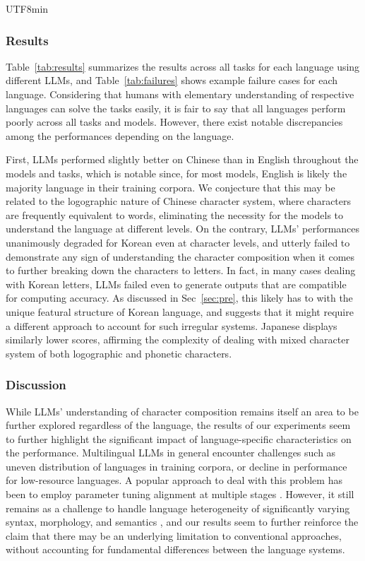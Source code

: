 \documentclass{article}
\theoremstyle{plain}
\theoremstyle{definition}
\theoremstyle{remark}
\begin{document}
\begin{CJK}{UTF8}{min}
\subsubsection{Results}
Table~\ref{tab:results} summarizes the results across all tasks for each language using different LLMs, and Table~\ref{tab:failures} shows example failure cases for each language. Considering that humans with elementary understanding of respective languages can solve the tasks easily, it is fair to say that all languages perform poorly across all tasks and models. However, there exist notable discrepancies among the performances depending on the language. 

First, LLMs performed slightly better on Chinese than in English throughout the models and tasks, which is notable since, for most models, English is likely the majority language in their training corpora. We conjecture that this may be related to the logographic nature of Chinese character system, where characters are frequently equivalent to words, eliminating the necessity for the models to understand the language at different levels. On the contrary, LLMs' performances unanimously degraded for Korean even at character levels, and utterly failed to demonstrate any sign of understanding the character composition when it comes to further breaking down the characters to letters. In fact, in many cases dealing with Korean letters, LLMs failed even to generate outputs that are compatible for computing accuracy. As discussed in Sec~\ref{sec:pre}, this likely has to with the unique featural structure of Korean language, and suggests that it might require a different approach to account for such irregular systems. Japanese displays similarly lower scores, affirming the complexity of dealing with mixed character system of both logographic and phonetic characters.


\subsubsection{Discussion}
While LLMs' understanding of character composition remains itself an area to be further explored regardless of the language, the results of our experiments seem to further highlight the significant impact of language-specific characteristics on the performance. Multilingual LLMs in general encounter challenges such as uneven distribution of languages in training corpora, or decline in performance for low-resource languages. A popular approach to deal with this problem has been to employ parameter tuning alignment at multiple stages \cite{Qin2024MultilingualLL}. However, it still remains as a challenge to handle language heterogeneity of significantly varying syntax, morphology, and semantics \cite{Xu2024ASO}, and our results seem to further reinforce the claim that there may be an underlying limitation to conventional approaches, without accounting for fundamental differences between the language systems.

\end{CJK}
\end{document}

